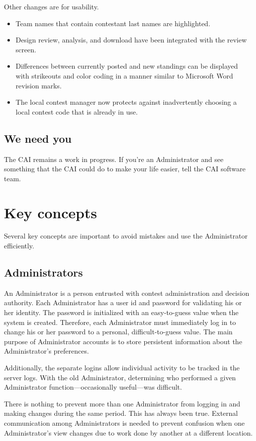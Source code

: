 \documentclass[11pt,letterpaper]{refart}
\begin{document}
Other changes are for usability. 
\begin{itemize}
\item Team names that contain contestant last names are highlighted.
\item Design review, analysis, and download have been integrated with the review screen. 
\item Differences between currently posted and new standings can be displayed with 
  strikeouts and color coding in a manner similar to Microsoft Word revision marks. 
\item The local contest manager now protects against inadvertently choosing a local 
  contest code that is already in use.
\end{itemize}

\subsection{We need you}
The CAI remains a work in progress. If you're an Administrator and see something
that the CAI could do to make your life easier, tell the CAI software team.

\section{Key concepts}
Several key concepts are important to avoid mistakes and use the Administrator
efficiently.

\subsection{Administrators}
An Administrator is a person entrusted with contest administration and decision authority. 
Each Administrator has a user id and password for validating his or her identity. The 
password is initialized with an easy-to-guess value when the system is 
created. Therefore, each Administrator must immediately log in to change his or her password 
to a personal, difficult-to-guess value. The main purpose of Administrator accounts is to
store persistent information about the Administrator's preferences. 

Additionally, the separate logins allow individual activity to be tracked in the server logs. 
With the old Administrator, determining who performed a given Administrator 
function---occasionally useful---was difficult.

There is nothing to prevent more than one Administrator from logging in 
and making changes during the same period. This has always been true. 
External communication among Administrators is needed to prevent
confusion when one Administrator's view changes due to work done by
another at a different location.
\end{document}

